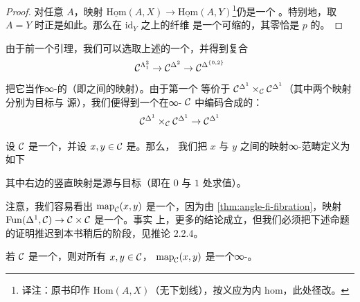 \begin{proof}
对任意\trSimplicialSet{} $A$，映射
$\underline{\mathrm{Hom}}(A, X) \to \underline{\mathrm{Hom}}(A, Y)$\footnote{译注：原书印作
$\mathrm{Hom}(A, X)$（无下划线），按义应为内 hom，此处径改。}仍是一个%
\trTrivialFibration{}。特别地，取 $A = Y$ 时正是如此。那么在 $\mathrm{id}_Y$ 之上的纤维
是一个可缩的\trKanComplex{}，其零\trSimplex{}恰是 $p$ 的\trSectionMap{}。
\end{proof}

由于前一个引理，我们可以选取上述\trTrivialFibration{}的一个\trSectionMap{}，并得到复合
\[
\mathcal{C}^{\Lambda^2_1} \to \mathcal{C}^{\Delta^2} \to \mathcal{C}^{\Delta^{\{0,2\}}}
\]
把它当作∞-\trCategories{}的\trFunctor{}（即\trSimplicialSet{}之间的映射）。由于第一个\trCategory{}%
等价于 $\mathcal{C}^{\Delta^1} \times_{\mathcal{C}} \mathcal{C}^{\Delta^1}$（其中两个映射分别为目标与
源），我们便得到一个在∞-\trCategory{} $\mathcal{C}$ 中编码合成的\trFunctor{}：
\[
\mathcal{C}^{\Delta^1} \times_{\mathcal{C}} \mathcal{C}^{\Delta^1} \to \mathcal{C}^{\Delta^1}
\]

\begin{definition}\label{def:mapping-infinity-category}
设 $\mathcal{C}$ 是一个\trInfinityCategory{}，并设 $x, y \in \mathcal{C}$ 是\trObject{}。那么，
我们把 $x$ 与 $y$ 之间的映射∞-范畴定义为如下\trPullback{}%
\begin{center}
\end{center}
其中右边的竖直映射是源与目标（即在 $0$ 与 $1$ 处求值）。
\end{definition}

注意，我们容易看出 $\mathrm{map}_{\mathcal{C}}(x, y)$ 是一个\trInfinityCategory{}，因为由
\cref{thm:angle-fi-fibration}，映射
$\mathrm{Fun}(\Delta^1, \mathcal{C}) \to \mathcal{C} \times \mathcal{C}$ 是一个\trInnerFibration{}。事实
上，更多的结论成立，但我们必须把下述命题的证明推迟到本书稍后的阶段，见推论
2.2.4。

\begin{proposition}\label{prop:mapping-infinity-groupoid}
若 $\mathcal{C}$ 是一个\trInfinityCategory{}，则对所有\trObject{} $x, y \in \mathcal{C}$，
$\mathrm{map}_{\mathcal{C}}(x, y)$ 是一个∞-\trGroupoid{}。
\end{proposition}

